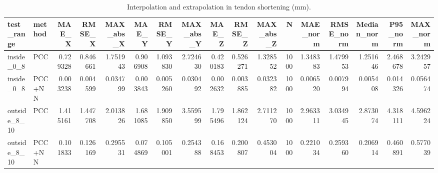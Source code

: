 \begin{table}
\caption{Interpolation and extrapolation in tendon shortening (mm).}
\label{tab:summer_generalization}
\begin{tabular}{llrrrrrrrrrrrrrrr}
\toprule
test_range & method & MAE_X & RMSE_X & MAX_abs_X & MAE_Y & RMSE_Y & MAX_abs_Y & MAE_Z & RMSE_Z & MAX_abs_Z & N & MAE_norm & RMSE_norm & Median_norm & P95_norm & MAX_norm \\
\midrule
inside_0_8 & PCC & 0.729328 & 0.846661 & 1.751943 & 0.906908 & 1.093830 & 2.724630 & 0.420183 & 0.526271 & 1.328552 & 1000 & 1.348383 & 1.479953 & 1.251646 & 2.468678 & 3.242957 \\
inside_0_8 & PCC+NN & 0.003238 & 0.004599 & 0.034799 & 0.003843 & 0.005260 & 0.030492 & 0.002632 & 0.003885 & 0.032382 & 1000 & 0.006520 & 0.007994 & 0.005408 & 0.014326 & 0.056474 \\
outside_8_10 & PCC & 1.415161 & 1.447708 & 2.013826 & 1.681085 & 1.909850 & 3.559599 & 1.795496 & 1.862124 & 2.711270 & 1000 & 2.963311 & 3.034945 & 2.873074 & 4.318111 & 4.596224 \\
outside_8_10 & PCC+NN & 0.101833 & 0.126169 & 0.295531 & 0.074869 & 0.105001 & 0.254388 & 0.168453 & 0.200807 & 0.453004 & 1000 & 0.221034 & 0.259360 & 0.206914 & 0.460891 & 0.577039 \\
\bottomrule
\end{tabular}
\end{table}
